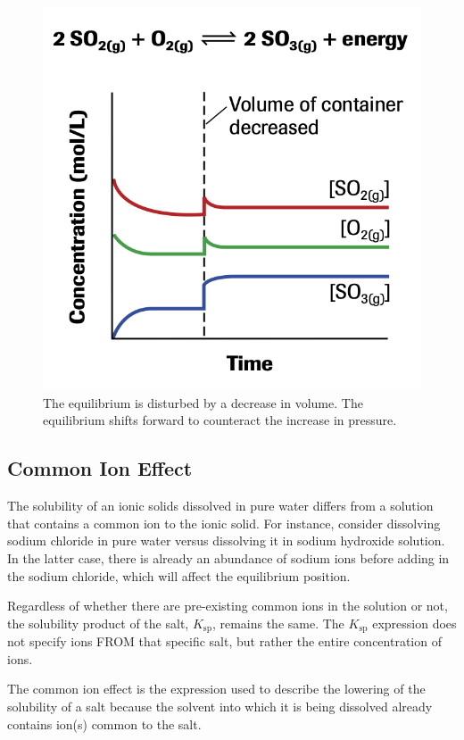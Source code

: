 \begin{figure}[ht!]
    \centering
    \includegraphics[width=0.4 \textwidth]{../figures/sulfur-trioxide-synthesis-equilibrium-change-gas.png}
    \caption{The equilibrium is disturbed by a decrease in volume. The equilibrium shifts forward
    to counteract the increase in pressure.}
\end{figure}

\subsection{Common Ion Effect}
The solubility of an ionic solids dissolved in pure water differs from a solution that contains
a common ion to the ionic solid. For instance, consider dissolving sodium chloride in pure water
versus dissolving it in sodium hydroxide solution. In the latter case, there is already an
abundance of sodium ions before adding in the sodium chloride, which will affect the equilibrium
position.

\begin{important}
    Regardless of whether there are pre-existing common ions in the solution or not, the solubility
    product of the salt, $K_\mathrm{sp}$, remains the same. The $K_\mathrm{sp}$ expression does
    not specify ions FROM that specific salt, but rather the entire concentration of ions.
\end{important}

The common ion effect is the expression used to describe the lowering of the solubility of a salt
because the solvent into which it is being dissolved already contains ion(s) common to the salt.

